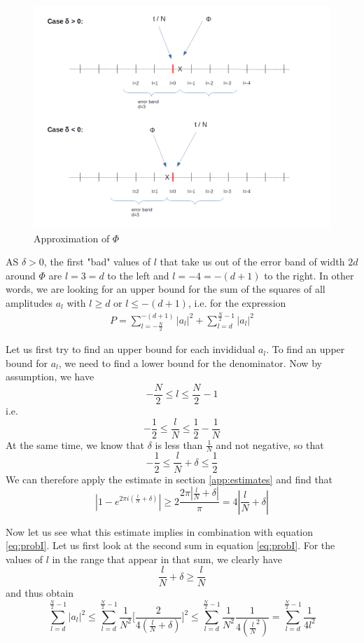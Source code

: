 \documentclass[a4paper, draft]{article}
\theoremstyle{own}
\theoremstyle{remark}
\begin{document}
\begin{figure}[ht]
\centering
\includegraphics[width=0.7\linewidth]{images/DeviationFromPhi}
\caption[Approximation of $\Phi$]{Approximation of $\Phi$}
\label{fig:DeviationFromPhi}
\end{figure}


AS $\delta > 0$, the first "bad" values of $l$ that take us out of the error band of width $2d$ around $\Phi$ are $l=3=d$ to the left and $l=-4=-(d+1)$ to the right. In other words, we are looking for an upper bound for the sum of the squares of all amplitudes $a_l$ with $l \geq d$ or $l \leq -(d+1)$, i.e. for the expression
\begin{align}\label{eq:probI}
P = \sum_{l = - \frac{N}{2}}^{-(d+1)} |a_l|^2 
+ 
\sum_{l=d}^{\frac{N}{2}-1} |a_l|^2
\end{align}

Let us first try to find an upper bound for each invididual $a_l$. To find an upper bound for $a_l$, we need to find a lower bound for the denominator. Now by assumption, we have
$$
- \frac{N}{2} \leq l \leq \frac{N}{2} - 1
$$
i.e.
$$
- \frac{1}{2} \leq \frac{l}{N} \leq \frac{1}{2} - \frac{1}{N}
$$
At the same time, we know that $\delta$ is less than $\frac{1}{N}$ and not negative, so that
$$
- \frac{1}{2} \leq \frac{l}{N} + \delta \leq \frac{1}{2} 
$$
We can therefore apply the estimate in section \ref{app:estimates} and find that
$$
| 1 - e^{2\pi i (\frac{l}{N} + \delta) } | \geq 2 \frac{2\pi  |\frac{l}{N} + \delta|}{\pi} = 4 |\frac{l}{N} + \delta|
$$

Now let us see what this estimate implies in combination with equation \eqref{eq:probI}. Let us first look at the second sum in equation \eqref{eq:probI}. For the values of $l$ in the range that appear in that sum, we clearly have
$$
\frac{l}{N} + \delta \geq \frac{l}{N}
$$
and thus obtain
$$
\sum_{l=d}^{\frac{N}{2}-1} |a_l|^2 \leq \sum_{l=d}^{\frac{N}{2}-1} \frac{1}{N^2} \big[ \frac{2}{4 (\frac{l}{N} + \delta)} \big]^2
\leq \sum_{l=d}^{\frac{N}{2}-1} \frac{1}{N^2} \frac{1}{4(\frac{l}{N}^2)} = \sum_{l=d}^{\frac{N}{2}-1} \frac{1}{4l^2}
$$
\end{document}
